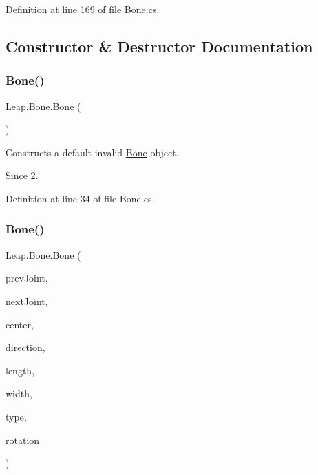 Definition at line 169 of file Bone.\+cs.



\subsection{Constructor \& Destructor Documentation}
\mbox{\label{class_leap_1_1_bone_aa9d04e2a54120f2981563db7cdf2a401}} 
\subsubsection{\texorpdfstring{Bone()}{Bone()}\hspace{0.1cm}{\footnotesize\ttfamily [1/2]}}
{\footnotesize\ttfamily Leap.\+Bone.\+Bone (\begin{DoxyParamCaption}{ }\end{DoxyParamCaption})}



Constructs a default invalid \mbox{\hyperlink{class_leap_1_1_bone}{Bone}} object. 

\begin{DoxySince}{Since}
2. 
\end{DoxySince}


Definition at line 34 of file Bone.\+cs.

\mbox{\label{class_leap_1_1_bone_adf72dc85b5d6205d225a7b5b72e2cb9e}} 
\subsubsection{\texorpdfstring{Bone()}{Bone()}\hspace{0.1cm}{\footnotesize\ttfamily [2/2]}}
{\footnotesize\ttfamily Leap.\+Bone.\+Bone (\begin{DoxyParamCaption}\item[{\mbox{\hyperlink{struct_leap_1_1_vector}{Vector}}}]{prev\+Joint,  }\item[{\mbox{\hyperlink{struct_leap_1_1_vector}{Vector}}}]{next\+Joint,  }\item[{\mbox{\hyperlink{struct_leap_1_1_vector}{Vector}}}]{center,  }\item[{\mbox{\hyperlink{struct_leap_1_1_vector}{Vector}}}]{direction,  }\item[{float}]{length,  }\item[{float}]{width,  }\item[{\mbox{\hyperlink{class_leap_1_1_bone_a21054e31cefa7b75f25a026006fdbb1b}{Bone.\+Bone\+Type}}}]{type,  }\item[{\mbox{\hyperlink{struct_leap_1_1_leap_quaternion}{Leap\+Quaternion}}}]{rotation }\end{DoxyParamCaption})}



